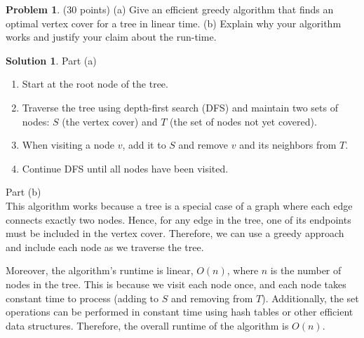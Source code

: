 \documentclass{article}
\theoremstyle{definition}
\newtheorem{problem}{Problem}
\newtheorem*{solution}{Solution}
\begin{document}
\begin{problem} (30 points)
  (a) Give an efficient greedy algorithm that finds an optimal vertex
  cover for a tree in linear time. (b) Explain why your algorithm
  works and justify your claim about the run-time. 
\end{problem}
\begin{solution}
Part (a)
\begin{enumerate}
    \item Start at the root node of the tree.
    \item Traverse the tree using depth-first search (DFS) and maintain two sets of nodes: $S$ (the vertex cover) and $T$ (the set of nodes not yet covered).
    \item When visiting a node $v$, add it to $S$ and remove $v$ and its neighbors from $T$.
    \item Continue DFS until all nodes have been visited.
\end{enumerate}

\noindent
Part (b)\\
This algorithm works because a tree is a special case of a graph where each edge connects exactly two nodes.
Hence, for any edge in the tree, one of its endpoints must be included in the vertex cover.
Therefore, we can use a greedy approach and include each node as we traverse the tree.

\noindent
Moreover, the algorithm's runtime is linear, $O(n)$, where $n$ is the number of nodes in the tree.
This is because we visit each node once, and each node takes constant time to process (adding to $S$ and removing from $T$).
Additionally, the set operations can be performed in constant time using hash tables or other efficient data structures.
Therefore, the overall runtime of the algorithm is $O(n)$.
\end{solution}
\end{document}
